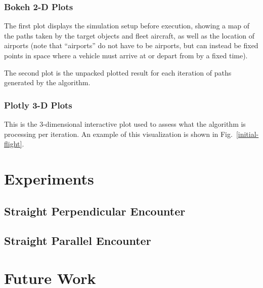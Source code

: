 \documentclass[conf]{new-aiaa}
\begin{document}
\subsubsection{Bokeh 2-D Plots}
The first plot displays the simulation setup before execution, showing a map of the paths taken by the target objects and fleet aircraft, as well as the location of airports (note that ``airports'' do not have to be airports, but can instead be fixed points in space where a vehicle must arrive at or depart from by a fixed time). 

The second plot is the unpacked plotted result for each iteration of paths generated by the algorithm.

\subsubsection{Plotly 3-D Plots}
This is the 3-dimensional interactive plot used to assess what the algorithm is processing per iteration. An example of this visualization is shown in Fig.~\ref{initial-flight}.






\section{Experiments}

\subsection{Straight Perpendicular Encounter}

\subsection{Straight Parallel Encounter}



\section{Future Work}
\end{document}

